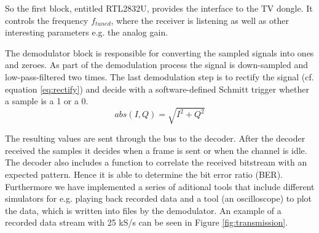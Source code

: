 \documentclass[conference]{IEEEtran}
\begin{document}
So the first block, entitled RTL2832U, provides the interface to the TV
dongle. It controls the frequency \ensuremath{f_{tuned}}, where the
receiver is listening as well as other interesting parameters e.g. the analog gain.

The demodulator block is responsible for converting the sampled signals
into ones and zeroes. 
As part of the demodulation process the signal is down-sampled and
low-pass-filtered two times. The last demodulation step is to rectify
the signal (cf. equation \ref{eq:rectify}) and decide with a
software-defined Schmitt trigger whether a sample is a 1 or a 0.  
\begin{equation}
	\label{eq:rectify}
	abs(I,Q) = \sqrt{I^2 +  Q^2}
\end{equation} 

The resulting values are sent through the bus to the decoder. After the decoder
received the samples it decides when a frame is sent or when the channel is
idle. The decoder also includes a function to correlate the received bitstream
with an expected pattern. Hence it is able to determine the bit error ratio
(BER). Furthermore we have implemented a series of aditional tools that include
different simulators for e.g. playing back recorded data and a tool (an
oscilloscope) to plot the data, which is written into files by the demodulator.
An example of a recorded data stream with 25 kS/s can be seen in Figure
\ref{fig:transmission}.  
\end{document}
